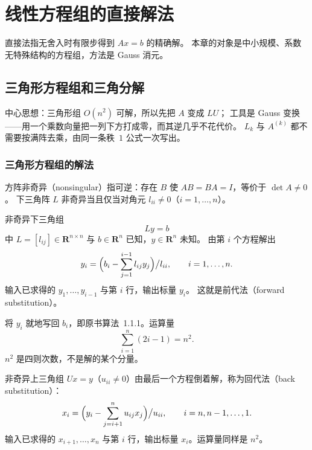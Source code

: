 \chapter{线性方程组的直接解法}

直接法指无舍入时有限步得到 $Ax=b$ 的精确解。
本章的对象是中小规模、系数无特殊结构的方程组，方法是 Gauss 消元。

\section{三角形方程组和三角分解}

中心思想：三角形组 $O(n^2)$ 可解，所以先把 $A$ 变成 $LU$；
工具是 Gauss 变换——用一个乘数向量把一列下方打成零，而其逆几乎不花代价。
$L_k$ 与 $A^{(k)}$ 都不需要按满阵去乘，由同一条秩~$1$ 公式一次写出。

\subsection{三角形方程组的解法}

方阵非奇异（nonsingular）指可逆：存在 $B$ 使 $AB=BA=I$，等价于 $\det A\neq 0$。
下三角阵 $L$ 非奇异当且仅当对角元 $l_{ii}\neq 0$（$i=1,\ldots,n$）。

非奇异下三角组
\begin{equation}
Ly=b
\end{equation}
中 $L=[l_{ij}]\in\mathbf{R}^{n\times n}$ 与 $b\in\mathbf{R}^{n}$ 已知，$y\in\mathbf{R}^{n}$ 未知。
由第 $i$ 个方程解出
\begin{equation}
y_i=\Bigl(b_i-\sum_{j=1}^{i-1}l_{ij}y_j\Bigr)\big/l_{ii},\qquad i=1,\ldots,n.
\end{equation}
输入已求得的 $y_1,\ldots,y_{i-1}$ 与第 $i$ 行，输出标量 $y_i$。
这就是前代法（forward substitution）。


将 $y_i$ 就地写回 $b_i$，即原书算法~1.1.1。运算量
\[
\sum_{i=1}^{n}(2i-1)=n^{2}.
\]
$n^2$ 是四则次数，不是解的某个分量。


非奇异上三角组 $Ux=y$（$u_{ii}\neq 0$）由最后一个方程倒着解，称为回代法（back substitution）：
\begin{equation}
x_i=\Bigl(y_i-\sum_{j=i+1}^{n}u_{ij}x_j\Bigr)\big/u_{ii},\qquad i=n,n-1,\ldots,1.
\end{equation}
输入已求得的 $x_{i+1},\ldots,x_n$ 与第 $i$ 行，输出标量 $x_i$。运算量同样是 $n^2$。

